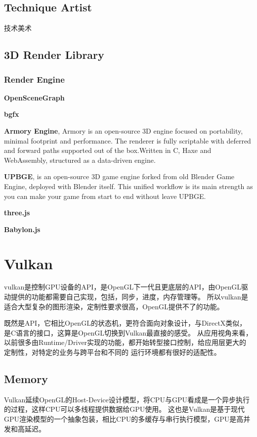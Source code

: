 \section{Technique Artist}
技术美术

\section{3D Render Library}

\subsection{Render Engine}

\textbf{OpenSceneGraph}

\textbf{bgfx}

\textbf{Armory Engine}\cite{Armory}, Armory is an open-source 3D engine focused on portability, minimal footprint and performance. The renderer is fully scriptable with deferred and forward paths supported out of the box.Written in C, Haxe and WebAssembly, structured as a data-driven engine.

\textbf{UPBGE}\cite{upbge}, is an open-source 3D game engine forked from old Blender Game Engine, deployed with Blender itself. This unified workflow is its main strength as you can make your game from start to end without leave UPBGE.

\textbf{three.js}

\textbf{Babylon.js}


\chapter{Vulkan}

vulkan是控制GPU设备的API，是OpenGL下一代且更底层的API，由OpenGL驱动提供的功能都需要自己实现，包括，同步，进度，内存管理等。
所以vulkan是适合大型复杂的图形渲染，定制性要求很高，OpenGL提供不了的功能。

既然是API，它相比OpenGL的状态机，更符合面向对象设计，与DirectX类似，是C语言的接口，这算是OpenGL切换到Vulkan最直接的感受。
从应用视角来看，以前很多由Runtime/Driver实现的功能，都开始转型接口控制，给应用层更大的定制性，对特定的业务与跨平台和不同的
运行环境都有很好的适配性。

\section{Memory}
Vulkan延续OpenGL的Host-Device设计模型，将CPU与GPU看成是一个异步执行的过程，这样CPU可以多线程提供数据给GPU使用。
这也是Vulkan是基于现代GPU渲染模型的一个抽象包装，相比CPU的多缓存与串行执行模型，GPU是高并发和高延迟。

